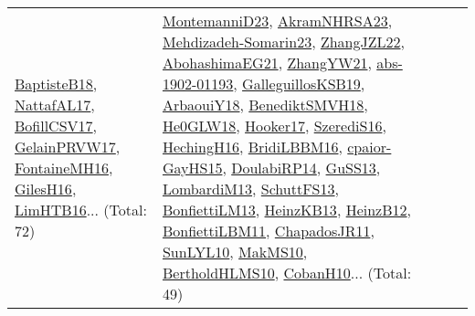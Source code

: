 {\begin{longtable}{lp{3cm}>{\raggedright}p{6cm}>{\raggedright}p{6cm}p{8cm}}
\href{articles/BaptisteB18.pdf}{BaptisteB18}\cite{BaptisteB18}, \href{articles/NattafAL17.pdf}{NattafAL17}\cite{NattafAL17}, \href{papers/BofillCSV17.pdf}{BofillCSV17}\cite{BofillCSV17}, \href{papers/GelainPRVW17.pdf}{GelainPRVW17}\cite{GelainPRVW17}, \href{papers/FontaineMH16.pdf}{FontaineMH16}\cite{FontaineMH16}, \href{papers/GilesH16.pdf}{GilesH16}\cite{GilesH16}, \href{papers/LimHTB16.pdf}{LimHTB16}\cite{LimHTB16}... (Total: 72) & \href{articles/MontemanniD23.pdf}{MontemanniD23}\cite{MontemanniD23}, \href{articles/AkramNHRSA23.pdf}{AkramNHRSA23}\cite{AkramNHRSA23}, \href{papers/Mehdizadeh-Somarin23.pdf}{Mehdizadeh-Somarin23}\cite{Mehdizadeh-Somarin23}, \href{papers/ZhangJZL22.pdf}{ZhangJZL22}\cite{ZhangJZL22}, \href{articles/AbohashimaEG21.pdf}{AbohashimaEG21}\cite{AbohashimaEG21}, \href{articles/ZhangYW21.pdf}{ZhangYW21}\cite{ZhangYW21}, \href{articles/abs-1902-01193.pdf}{abs-1902-01193}\cite{abs-1902-01193}, \href{papers/GalleguillosKSB19.pdf}{GalleguillosKSB19}\cite{GalleguillosKSB19}, \href{papers/ArbaouiY18.pdf}{ArbaouiY18}\cite{ArbaouiY18}, \href{papers/BenediktSMVH18.pdf}{BenediktSMVH18}\cite{BenediktSMVH18}, \href{papers/He0GLW18.pdf}{He0GLW18}\cite{He0GLW18}, \href{papers/Hooker17.pdf}{Hooker17}\cite{Hooker17}, \href{papers/SzerediS16.pdf}{SzerediS16}\cite{SzerediS16}, \href{papers/HechingH16.pdf}{HechingH16}\cite{HechingH16}, \href{papers/BridiLBBM16.pdf}{BridiLBBM16}\cite{BridiLBBM16}, \href{papers/cpaior-GayHS15.pdf}{cpaior-GayHS15}\cite{cpaior-GayHS15}, \href{papers/DoulabiRP14.pdf}{DoulabiRP14}\cite{DoulabiRP14}, \href{papers/GuSS13.pdf}{GuSS13}\cite{GuSS13}, \href{papers/LombardiM13.pdf}{LombardiM13}\cite{LombardiM13}, \href{papers/SchuttFS13.pdf}{SchuttFS13}\cite{SchuttFS13}, \href{papers/BonfiettiLM13.pdf}{BonfiettiLM13}\cite{BonfiettiLM13}, \href{papers/HeinzKB13.pdf}{HeinzKB13}\cite{HeinzKB13}, \href{papers/HeinzB12.pdf}{HeinzB12}\cite{HeinzB12}, \href{papers/BonfiettiLBM11.pdf}{BonfiettiLBM11}\cite{BonfiettiLBM11}, \href{papers/ChapadosJR11.pdf}{ChapadosJR11}\cite{ChapadosJR11}, \href{papers/SunLYL10.pdf}{SunLYL10}\cite{SunLYL10}, \href{papers/MakMS10.pdf}{MakMS10}\cite{MakMS10}, \href{papers/BertholdHLMS10.pdf}{BertholdHLMS10}\cite{BertholdHLMS10}, \href{papers/CobanH10.pdf}{CobanH10}\cite{CobanH10}... (Total: 49)\\

\end{longtable}}
